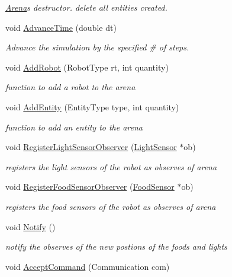 \begin{DoxyCompactItemize}
\begin{DoxyCompactList}\small\item\em \hyperlink{class_arena}{Arena}\textquotesingle{}s destructor. {\ttfamily delete} all entities created. \end{DoxyCompactList}\item 
void \hyperlink{class_arena_ad92d8b2e1593b652445e31d173977fc6}{Advance\+Time} (double dt)
\begin{DoxyCompactList}\small\item\em Advance the simulation by the specified \# of steps. \end{DoxyCompactList}\item 
void \hyperlink{class_arena_a0012b0774ae6642a1a559b97ca335c4b}{Add\+Robot} (Robot\+Type rt, int quantity)
\begin{DoxyCompactList}\small\item\em function to add a robot to the arena \end{DoxyCompactList}\item 
void \hyperlink{class_arena_a9e00ef1a079d49d648359952fcfaa9f3}{Add\+Entity} (Entity\+Type type, int quantity)
\begin{DoxyCompactList}\small\item\em function to add an entity to the arena \end{DoxyCompactList}\item 
void \hyperlink{class_arena_a3166b6d49cc1fa5a526317ee55eefa16}{Register\+Light\+Sensor\+Observer} (\hyperlink{class_light_sensor}{Light\+Sensor} $\ast$ob)
\begin{DoxyCompactList}\small\item\em registers the light sensors of the robot as observes of arena \end{DoxyCompactList}\item 
void \hyperlink{class_arena_acb467d8cd9635b2dd0a3a22f08f543c7}{Register\+Food\+Sensor\+Observer} (\hyperlink{class_food_sensor}{Food\+Sensor} $\ast$ob)
\begin{DoxyCompactList}\small\item\em registers the food sensors of the robot as observes of arena \end{DoxyCompactList}\item 
void \hyperlink{class_arena_a694758081979e9944031000a375a3a6a}{Notify} ()\hypertarget{class_arena_a694758081979e9944031000a375a3a6a}{}\label{class_arena_a694758081979e9944031000a375a3a6a}

\begin{DoxyCompactList}\small\item\em notify the observes of the new postions of the foods and lights \end{DoxyCompactList}\item 
void \hyperlink{class_arena_a16fac8e4b2399fcf0db01a9722069c33}{Accept\+Command} (Communication com)\hypertarget{class_arena_a16fac8e4b2399fcf0db01a9722069c33}{}\label{class_arena_a16fac8e4b2399fcf0db01a9722069c33}


\end{DoxyCompactItemize}
